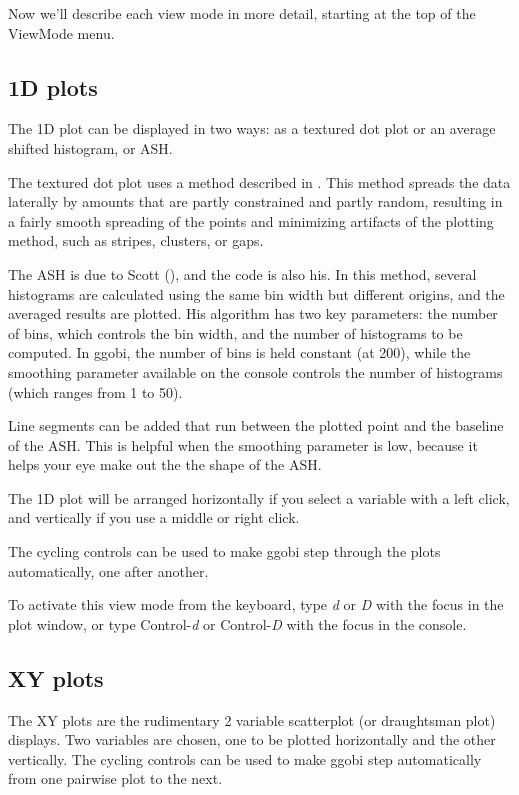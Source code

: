\documentclass[11pt]{article}
\begin{document}
Now we'll describe each view mode in more detail, starting at the
top of the ViewMode menu. 

\subsection{1D plots}

The 1D plot can be displayed in two ways:  as a textured dot plot
or an average shifted histogram, or ASH.

The textured dot plot uses a method described in
\cite{TukeyTukey90}.  This method spreads the data laterally by
amounts that are partly constrained and partly random, resulting in a
fairly smooth spreading of the points and minimizing artifacts of the
plotting method, such as stripes, clusters, or gaps.

The ASH is due to Scott (\cite{Scott92}),
and the code is also his.  In this method, several histograms are
calculated using the same bin width but different origins, and the
averaged results are plotted.  His algorithm has two key parameters: 
the number of bins, which controls the bin width, and the number of
histograms to be computed.
In ggobi, the number of bins is held constant (at 200), while the
smoothing parameter available on the console controls the number of
histograms (which ranges from 1 to 50).

Line segments can be added that run between
the plotted point and the baseline of the ASH.  This is helpful
when the smoothing parameter is low, because it helps your eye
make out the the shape of the ASH.

The 1D plot will be arranged horizontally if you select a variable
with a left click, and vertically if you use a middle or right click.

The cycling controls can be used to make ggobi step through the
plots automatically, one after another.

To activate this view mode from the keyboard, type {\em d} or {\em D}
with the focus in the plot window, or type Control-{\em d} or
Control-{\em D} with the focus in the console.

\subsection{XY plots}

The XY plots are the rudimentary 2 variable scatterplot (or draughtsman
plot) displays. Two variables are chosen, one to be plotted horizontally
and the other vertically. The cycling controls can be used to make ggobi
step automatically from one pairwise plot to the next.
\end{document}
